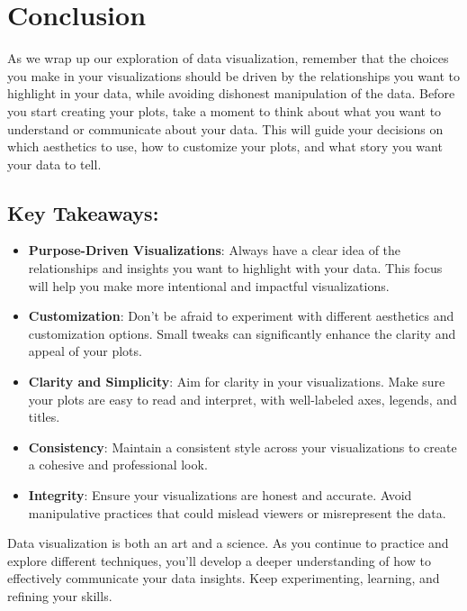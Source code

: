 \documentclass[
  letterpaper,
  DIV=11,
  numbers=noendperiod]{scrreprt}
\providecommand{\tightlist}{%
  \setlength{\itemsep}{0pt}\setlength{\parskip}{0pt}}\usepackage{longtable,booktabs,array}
\begin{document}

\hypertarget{conclusion}{%
\chapter{Conclusion}\label{conclusion}}

As we wrap up our exploration of data visualization, remember that the
choices you make in your visualizations should be driven by the
relationships you want to highlight in your data, while avoiding
dishonest manipulation of the data. Before you start creating your
plots, take a moment to think about what you want to understand or
communicate about your data. This will guide your decisions on which
aesthetics to use, how to customize your plots, and what story you want
your data to tell.

\hypertarget{key-takeaways}{%
\section{Key Takeaways:}\label{key-takeaways}}

\begin{itemize}
\tightlist
\item
  \textbf{Purpose-Driven Visualizations}: Always have a clear idea of
  the relationships and insights you want to highlight with your data.
  This focus will help you make more intentional and impactful
  visualizations.
\item
  \textbf{Customization}: Don't be afraid to experiment with different
  aesthetics and customization options. Small tweaks can significantly
  enhance the clarity and appeal of your plots.
\item
  \textbf{Clarity and Simplicity}: Aim for clarity in your
  visualizations. Make sure your plots are easy to read and interpret,
  with well-labeled axes, legends, and titles.
\item
  \textbf{Consistency}: Maintain a consistent style across your
  visualizations to create a cohesive and professional look.
\item
  \textbf{Integrity}: Ensure your visualizations are honest and
  accurate. Avoid manipulative practices that could mislead viewers or
  misrepresent the data.
\end{itemize}

Data visualization is both an art and a science. As you continue to
practice and explore different techniques, you'll develop a deeper
understanding of how to effectively communicate your data insights. Keep
experimenting, learning, and refining your skills.
\end{document}
